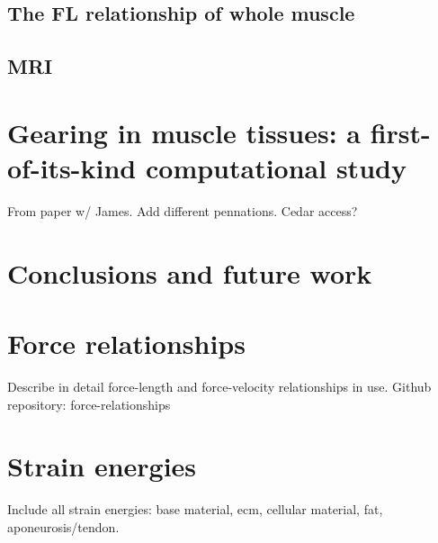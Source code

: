 \documentclass{sfuthesis}
\numberwithin{equation}{section}
\numberwithin{figure}{chapter}
\numberwithin{table}{chapter}
\theoremstyle{definition}
\begin{document}
\section{The FL relationship of whole muscle}

\section{MRI}
























\chapter{Gearing in muscle tissues: a first-of-its-kind computational study}

From paper w/ James. Add different pennations. Cedar access?



\chapter{Conclusions and future work}


%
%
%
%
%

\backmatter%
    
    

\begin{appendices} %

\chapter{Force relationships} \label{app:force_relationships}

Describe in detail force-length and force-velocity relationships in use.
Github repository: force-relationships

\chapter{Strain energies}

Include all strain energies: base material, ecm, cellular material, fat, aponeurosis/tendon.

\end{appendices}
\end{document}
